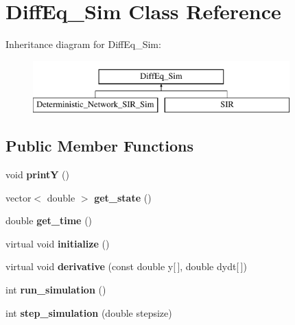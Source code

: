 \hypertarget{classDiffEq__Sim}{}\section{Diff\+Eq\+\_\+\+Sim Class Reference}
\label{classDiffEq__Sim}
Inheritance diagram for Diff\+Eq\+\_\+\+Sim\+:\begin{figure}[H]
\begin{center}
\leavevmode
\includegraphics[height=2.000000cm]{classDiffEq__Sim}
\end{center}
\end{figure}
\subsection*{Public Member Functions}
\begin{DoxyCompactItemize}
\item 
\hypertarget{classDiffEq__Sim_a1bc98d13679395c4e9bb4a3e7e3d2722}{}void {\bfseries print\+Y} ()\label{classDiffEq__Sim_a1bc98d13679395c4e9bb4a3e7e3d2722}

\item 
\hypertarget{classDiffEq__Sim_aaae80a9a49cc714ae981d4122955f124}{}vector$<$ double $>$ {\bfseries get\+\_\+state} ()\label{classDiffEq__Sim_aaae80a9a49cc714ae981d4122955f124}

\item 
\hypertarget{classDiffEq__Sim_ade2acaa00bb9ee6d3ef84ae880cab290}{}double {\bfseries get\+\_\+time} ()\label{classDiffEq__Sim_ade2acaa00bb9ee6d3ef84ae880cab290}

\item 
\hypertarget{classDiffEq__Sim_aa5f364b0f3d90d833f390e155473b1ea}{}virtual void {\bfseries initialize} ()\label{classDiffEq__Sim_aa5f364b0f3d90d833f390e155473b1ea}

\item 
\hypertarget{classDiffEq__Sim_a77f15d45811b240771421ccb9e2dc1aa}{}virtual void {\bfseries derivative} (const double y\mbox{[}$\,$\mbox{]}, double dydt\mbox{[}$\,$\mbox{]})\label{classDiffEq__Sim_a77f15d45811b240771421ccb9e2dc1aa}

\item 
\hypertarget{classDiffEq__Sim_a6ba394082d829dfb5cdb2a98ac370169}{}int {\bfseries run\+\_\+simulation} ()\label{classDiffEq__Sim_a6ba394082d829dfb5cdb2a98ac370169}

\item 
\hypertarget{classDiffEq__Sim_a6812a26bfdcd0559f2e0a473ffb611c9}{}int {\bfseries step\+\_\+simulation} (double stepsize)\label{classDiffEq__Sim_a6812a26bfdcd0559f2e0a473ffb611c9}

\end{DoxyCompactItemize}
